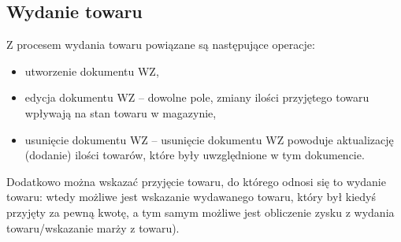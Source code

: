 \subsection{Wydanie towaru}
Z procesem wydania towaru powiązane są następujące operacje:
\begin{itemize}
\item utworzenie dokumentu WZ,
\item edycja dokumentu WZ -- dowolne pole, zmiany ilości przyjętego
  towaru wpływają na stan towaru w magazynie,
\item usunięcie dokumentu WZ -- usunięcie dokumentu WZ powoduje
  aktualizację (dodanie) ilości towarów, które były uwzględnione w tym
  dokumencie.
\end{itemize}

Dodatkowo można wskazać przyjęcie towaru, do którego odnosi się to
wydanie towaru: wtedy możliwe jest wskazanie wydawanego towaru, który
był kiedyś przyjęty za pewną kwotę, a tym samym możliwe jest
obliczenie zysku z wydania towaru/wskazanie marży z towaru).

